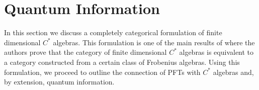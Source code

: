 
\pagebreak

\section{Quantum Information}

In this section we discuss a completely categorical formulation of finite
dimensional $C^*$ algebras. This formulation is one of the main results of
\cite{channels} where the authors prove that the category of finite dimensional
$C^*$ algebras is equivalent to a category constructed from a certain class of
Frobenius algebras. Using this formulation, we proceed to outline the connection
of PFTs with $C^*$ algebras and, by extension, quantum information.






%

